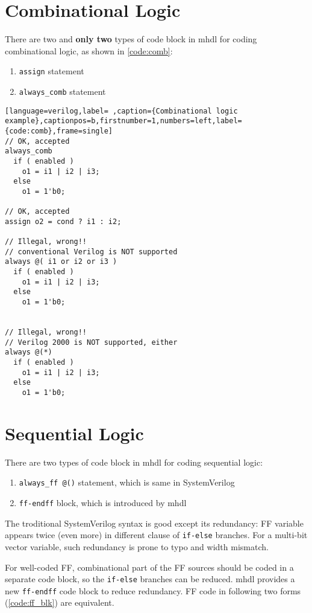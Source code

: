 \documentclass[10pt,oneside]{book}
\begin{document}
\section{Combinational Logic}
\label{sec:org5bdcb1d}
There are two and \textbf{only two} types of code block in mhdl for coding
combinational logic, as shown in \autoref{code:comb}:

\begin{enumerate}
\item \texttt{assign} statement
\item \texttt{always\_comb} statement
\end{enumerate}

\begin{lstlisting}[language=verilog,label= ,caption={Combinational logic example},captionpos=b,firstnumber=1,numbers=left,label={code:comb},frame=single]
// OK, accepted
always_comb
  if ( enabled )
    o1 = i1 | i2 | i3;
  else
    o1 = 1'b0;

// OK, accepted
assign o2 = cond ? i1 : i2;

// Illegal, wrong!!
// conventional Verilog is NOT supported
always @( i1 or i2 or i3 )
  if ( enabled )
    o1 = i1 | i2 | i3;
  else
    o1 = 1'b0;


// Illegal, wrong!!
// Verilog 2000 is NOT supported, either
always @(*)
  if ( enabled )
    o1 = i1 | i2 | i3;
  else
    o1 = 1'b0;  
\end{lstlisting}

\section{Sequential Logic}
\label{sec:org1aa85b8}
There are two types of code block in mhdl for coding sequential logic:

\begin{enumerate}
\item \texttt{always\_ff @()} statement, which is same in SystemVerilog
\item \texttt{ff-endff} block, which is introduced by mhdl
\end{enumerate}

The troditional SystemVerilog syntax is good except its redundancy: FF
variable appears twice (even more) in different clause of \texttt{if-else}
branches.  For a multi-bit vector variable, such redundancy is prone
to typo and width mismatch.

For well-coded FF, combinational part of the FF sources should be
coded in a separate code block, so the \texttt{if-else} branches can be
reduced.  mhdl provides a new \texttt{ff-endff} code block to reduce
redundancy.  FF code in following two forms (\autoref{code:ff_blk}) are
equivalent.
\end{document}
